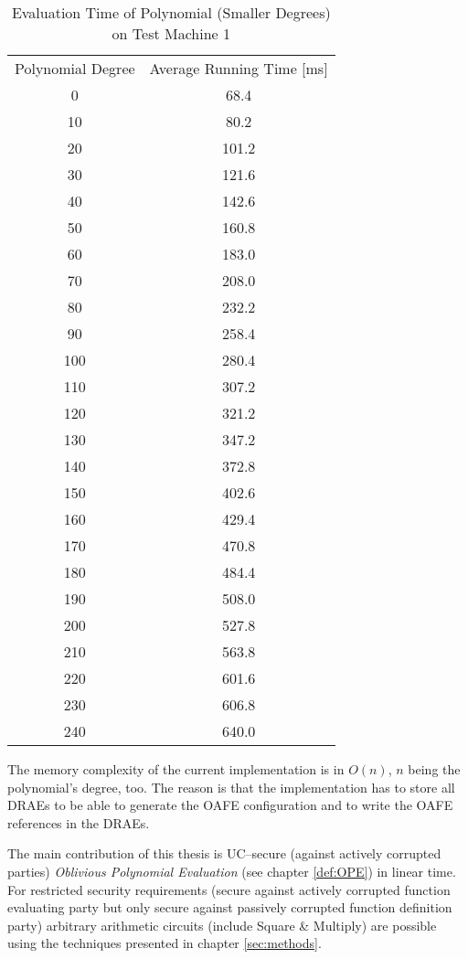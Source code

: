 \begin{table}[ht]
  \centering
  \begin{tabular}{|c|c|}
    Polynomial Degree & Average Running Time [ms] \\
    0  & 68.4 \\
    10 &  80.2 \\
    20 & 101.2 \\
    30 & 121.6 \\
    40 & 142.6 \\
    50 & 160.8 \\
    60 & 183.0 \\
    70 & 208.0 \\
    80 & 232.2 \\
    90 & 258.4 \\
    100 & 280.4 \\
    110 & 307.2 \\
    120 & 321.2 \\
    130 & 347.2 \\
    140 & 372.8 \\
    150 & 402.6 \\
    160 & 429.4 \\
    170 & 470.8 \\
    180 & 484.4 \\
    190 & 508.0 \\
    200 & 527.8 \\
    210 & 563.8 \\
    220 & 601.6 \\
    230 & 606.8 \\
    240 & 640.0 \\
  \end{tabular}
  \caption{Evaluation Time of Polynomial (Smaller Degrees) on Test Machine 1}
  \label{tab:poly-deg-t-small}
\end{table}


%
%
\label{sec:mem-complexity}

The memory complexity of the current implementation is in $O(n)$, $n$ being the
polynomial's degree, too. The reason is that the implementation has to store all
DRAEs to be able to generate the OAFE configuration and to write the OAFE
references in the DRAEs.


%
%
\label{sec:contribution}

The main contribution of this thesis is UC--secure (against actively corrupted
parties) \emph{Oblivious Polynomial Evaluation} (see chapter \ref{def:OPE}) in
linear time. For restricted security requirements (secure against actively
corrupted function evaluating party but only secure against passively corrupted
function definition party) arbitrary arithmetic circuits (include Square \&
Multiply) are possible using the techniques presented in chapter
\ref{sec:methods}.

